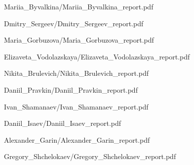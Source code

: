 \documentclass[a4paper]{article}
\begin{document}
{Mariia_Byvalkina/Mariia_Byvalkina_report.pdf}

{Dmitry_Sergeev/Dmitry_Sergeev_report.pdf}

{Maria_Gorbuzova/Maria_Gorbuzova_report.pdf}

{Elizaveta_Vodolazskaya/Elizaveta_Vodolazskaya_report.pdf}

{Nikita_Brulevich/Nikita_Brulevich_report.pdf}

{Daniil_Pravkin/Daniil_Pravkin_report.pdf}

{Ivan_Shamanaev/Ivan_Shamanaev_report.pdf}

{Daniil_Isaev/Daniil_Isaev_report.pdf}

{Alexander_Garin/Alexander_Garin_report.pdf}

{Gregory_Shchelokaev/Gregory_Shchelokaev_report.pdf}
\end{document}
